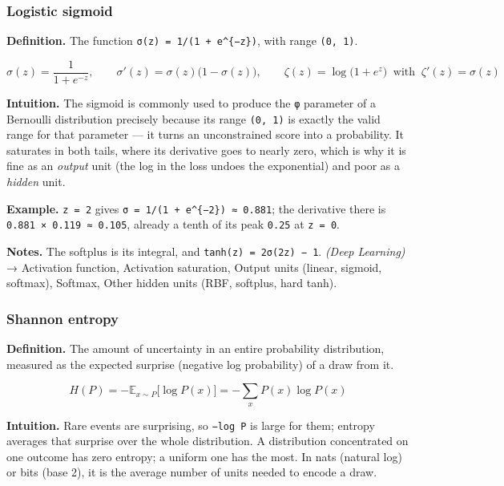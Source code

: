 \documentclass[
  10pt,
  letterpaper,
  onecolumn]{article}
\begin{document}
\hypertarget{logistic-sigmoid}{%
\subsubsection{Logistic sigmoid}\label{logistic-sigmoid}}

\textbf{Definition.} The function
\texttt{σ(z)\ =\ 1/(1\ +\ e\^{}\{−z\})}, with range
\texttt{(0,\ 1)}.

\begin{equation*}
\sigma(z)=\frac{1}{1+e^{-z}},
\qquad
\sigma'(z)=\sigma(z)\bigl(1-\sigma(z)\bigr),
\qquad
\zeta(z)=\log\bigl(1+e^{z}\bigr)\ \text{ with }\ \zeta'(z)=\sigma(z)
\end{equation*}

\textbf{Intuition.} The sigmoid is commonly used to produce the
\texttt{φ} parameter of a Bernoulli distribution precisely because its
range \texttt{(0,\ 1)} is exactly the valid range for that parameter ---
it turns an unconstrained score into a probability. It saturates in both
tails, where its derivative goes to nearly zero, which is why it is fine
as an \emph{output} unit (the log in the loss undoes the exponential)
and poor as a \emph{hidden} unit.

\textbf{Example.} \texttt{z\ =\ 2} gives
\texttt{σ\ =\ 1/(1\ +\ e\^{}\{−2\})\ ≈\ 0.881}; the derivative there is
\texttt{0.881\ ×\ 0.119\ ≈\ 0.105}, already a tenth of its peak
\texttt{0.25} at \texttt{z\ =\ 0}.

\textbf{Notes.} The softplus is its integral, and
\texttt{tanh(z)\ =\ 2σ(2z)\ −\ 1}. \emph{(Deep Learning)} → Activation
function, Activation saturation, Output units (linear, sigmoid,
softmax), Softmax, Other hidden units (RBF, softplus, hard tanh).

\hypertarget{shannon-entropy}{%
\subsubsection{Shannon entropy}\label{shannon-entropy}}

\textbf{Definition.} The amount of uncertainty in an entire probability
distribution, measured as the expected surprise (negative log
probability) of a draw from it.

\begin{equation*}
H(P)=-\mathbb{E}_{x\sim P}\bigl[\log P(x)\bigr]=-\sum_x P(x)\log P(x)
\end{equation*}

\textbf{Intuition.} Rare events are surprising, so \texttt{−log\ P}
is large for them; entropy averages that surprise over the whole
distribution. A distribution concentrated on one outcome has zero
entropy; a uniform one has the most. In nats (natural log) or bits
(base 2), it is the average number of units needed to encode a draw.
\end{document}
